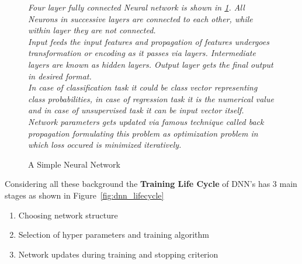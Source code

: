 \begin{figure}[H]
\centering
	\caption{\label{fig:nn_simple_dep} A Simple Neural Network}
	\medskip
	\small
	\begin{flushleft}
	\textit{Four layer fully connected Neural network is shown in \ref{fig:nn_simple_dep}. All Neurons in successive layers are connected to each other, while within layer they are not connected.\\ 
	Input feeds the input features and propagation of features undergoes transformation or encoding as it passes via layers. 
	Intermediate layers are known as hidden layers. Output layer gets the final output in desired format. \\
	In case of classification task it could be class vector representing class probabilities, in case of regression task it is the numerical value and in case of unsupervised task it can be input vector itself. Network parameters gets updated via famous technique called back propagation formulating this problem as optimization problem in which loss occured is minimized iteratively.}
	\end{flushleft}
	 
\end{figure}


Considering all these background the \textbf{Training Life Cycle} of DNN's has 3 main stages as shown in Figure~\ref{fig:dnn_lifecycle}

\begin{enumerate}
	\item Choosing network structure
	\item Selection of hyper parameters and training algorithm
	\item Network updates during training and stopping criterion
\end{enumerate}

